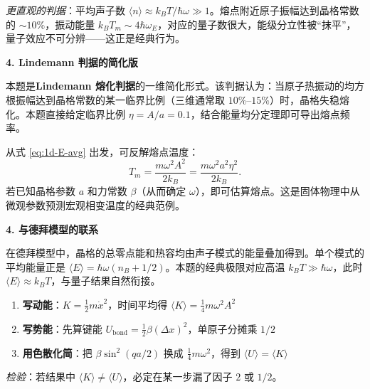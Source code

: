 \begin{insightbox}[物理图像与深层联系]
\textit{更直观的判据}：平均声子数 $\langle n\rangle \approx k_BT/\hbar\omega \gg 1$。熔点附近原子振幅达到晶格常数的 $\sim10\%$，振动能量 $k_BT_m\sim 4\hbar\omega_E$，对应的量子数很大，能级分立性被``抹平''，量子效应不可分辨——这正是经典行为。

\textbf{4. Lindemann 判据的简化版}

本题是\textbf{Lindemann 熔化判据}的一维简化形式。该判据认为：当原子热振动的均方根振幅达到晶格常数的某一临界比例（三维通常取 $10\%\text{--}15\%$）时，晶格失稳熔化。本题直接给定临界比例 $\eta=A/a=0.1$，结合能量均分定理即可导出熔点频率。

从式 \eqref{eq:1d-E-avg} 出发，可反解熔点温度：
\[
T_m = \frac{m\omega^2 A^2}{2k_B} = \frac{m\omega^2 a^2\eta^2}{2k_B}.
\]
若已知晶格参数 $a$ 和力常数 $\beta$（从而确定 $\omega$），即可估算熔点。这是固体物理中从微观参数预测宏观相变温度的经典范例。

\textbf{4. 与德拜模型的联系}

在德拜模型中，晶格的总零点能和热容均由声子模式的能量叠加得到。单个模式的平均能量正是 $\langle E\rangle=\hbar\omega(n_B+1/2)$。本题的经典极限对应高温 $k_BT\gg\hbar\omega$，此时 $\langle E\rangle\approx k_BT$，与量子结果自然衔接。
\end{insightbox}

\begin{thinkbox}
\begin{enumerate}
    \item \textbf{写动能}：$K=\frac12 m\dot x^2$，时间平均得 $\langle K\rangle=\frac14 m\omega^2 A^2$
    \item \textbf{写势能}：先算键能 $U_{\text{bond}}=\frac12\beta(\Delta x)^2$，单原子分摊乘 $1/2$
    \item \textbf{用色散化简}：把 $\beta\sin^2(qa/2)$ 换成 $\frac14 m\omega^2$，得到 $\langle U\rangle=\langle K\rangle$
\end{enumerate}
\textit{检验}：若结果中 $\langle K\rangle\neq\langle U\rangle$，必定在某一步漏了因子 $2$ 或 $1/2$。
\end{thinkbox}
